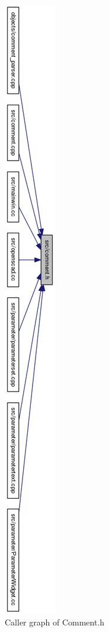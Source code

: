 \begin{figure}
\centering
\includegraphics[width=0.25\linewidth,height=1.37\columnwidth]{images/comment}
\caption{Caller graph of Comment.h}
\label{fig:comment}
\end{figure}
